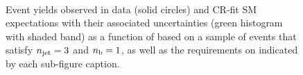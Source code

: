 \begin{figure}[h!]
\begin{center}
    \\
    \caption{Event yields observed in data (solid circles) and CR-fit SM expectations with their associated uncertainties (green histogram with shaded band) as a function of \HTmiss based on a sample of events that satisfy $n_{\text{jet}} = 3$ and $n_{\text{b}} = 1$, as well as the requirements on \scalht indicated by each sub-figure caption. }
    \label{fig:mhtval_eq3j_eq1b}
  \end{center}
\end{figure}

